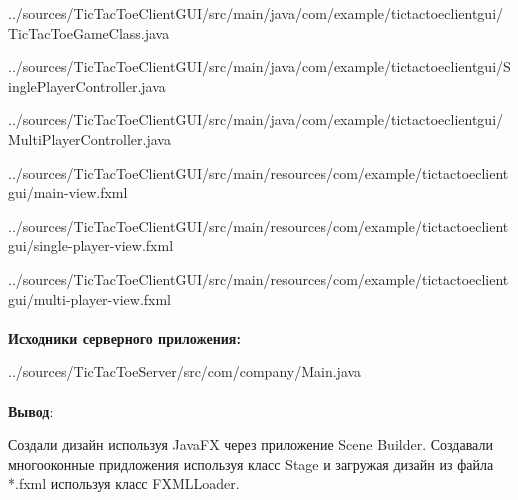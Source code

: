 \documentclass[12pt, a4paper, simple]{eskdtext}
\begin{document}
    
    {../sources/TicTacToeClientGUI/src/main/java/com/example/tictactoeclientgui/TicTacToeGameClass.java}

    
    {../sources/TicTacToeClientGUI/src/main/java/com/example/tictactoeclientgui/SinglePlayerController.java}

    
    {../sources/TicTacToeClientGUI/src/main/java/com/example/tictactoeclientgui/MultiPlayerController.java}

    
    {../sources/TicTacToeClientGUI/src/main/resources/com/example/tictactoeclientgui/main-view.fxml}

    
    {../sources/TicTacToeClientGUI/src/main/resources/com/example/tictactoeclientgui/single-player-view.fxml}

    
    {../sources/TicTacToeClientGUI/src/main/resources/com/example/tictactoeclientgui/multi-player-view.fxml}

    \paragraph{}\textbf{Исходники серверного приложения:}

    
    {../sources/TicTacToeServer/src/com/company/Main.java}


    \paragraph{} \textbf{Вывод}:

    Создали дизайн используя JavaFX через приложение Scene Builder.
    Создавали многооконные придложения используя класс Stage и загружая дизайн из файла *.fxml используя класс FXMLLoader.
    
\end{document}
